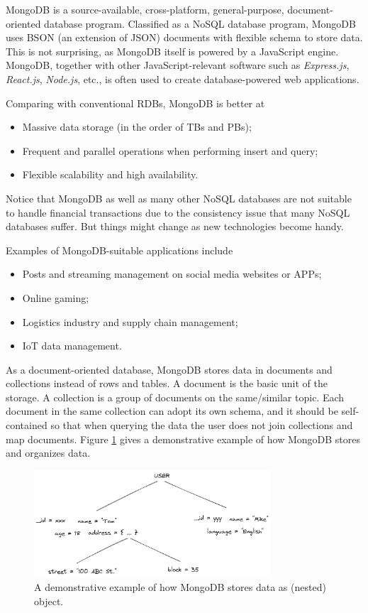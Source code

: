 MongoDB is a source-available, cross-platform, general-purpose, document-oriented database program. Classified as a NoSQL database program, MongoDB uses BSON (an extension of JSON) documents with flexible schema to store data. This is not surprising, as MongoDB itself is powered by a JavaScript engine. MongoDB, together with other JavaScript-relevant software such as \textit{Express.js}, \textit{React.js}, \textit{Node.js}, etc., is often used to create database-powered web applications.

Comparing with conventional RDBs, MongoDB is better at
\begin{itemize}
	\item Massive data storage (in the order of TBs and PBs);
	\item Frequent and parallel operations when performing insert and query;
	\item Flexible scalability and high availability.
\end{itemize}
Notice that MongoDB as well as many other NoSQL databases are not suitable to handle financial transactions due to the consistency issue that many NoSQL databases suffer. But things might change as new technologies become handy.

Examples of MongoDB-suitable applications include
\begin{itemize}
	\item Posts and streaming management on social media websites or APPs;
	\item Online gaming;
	\item Logistics industry and supply chain management;
	\item IoT data management.
\end{itemize}

As a document-oriented database, MongoDB stores data in documents and collections instead of rows and tables. A document is the basic unit of the storage. A collection is a group of documents on the same/similar topic. Each document in the same collection can adopt its own schema, and it should be self-contained so that when querying the data the user does not join collections and map documents. Figure \ref{ch:database:mongotree} gives a demonstrative example of how MongoDB stores and organizes data.
\begin{figure}[htbp]
	\centering
	\includegraphics[width=250pt]{chapters/part-3/figures/mongodb_tree.png}
	\caption{A demonstrative example of how MongoDB stores data as (nested) object.} \label{ch:database:mongotree}
\end{figure}

